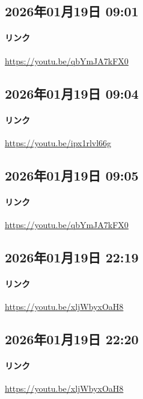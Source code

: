 \subsection*{2026年01月19日 09:01}

\paragraph{リンク}
\url{https://youtu.be/qbYmJA7kFX0}

\subsection*{2026年01月19日 09:04}

\paragraph{リンク}
\url{https://youtu.be/ipx1rlvl66g}

\subsection*{2026年01月19日 09:05}

\paragraph{リンク}
\url{https://youtu.be/qbYmJA7kFX0}

\subsection*{2026年01月19日 22:19}

\paragraph{リンク}
\url{https://youtu.be/xljWbyxOaH8}

\subsection*{2026年01月19日 22:20}

\paragraph{リンク}
\url{https://youtu.be/xljWbyxOaH8}

